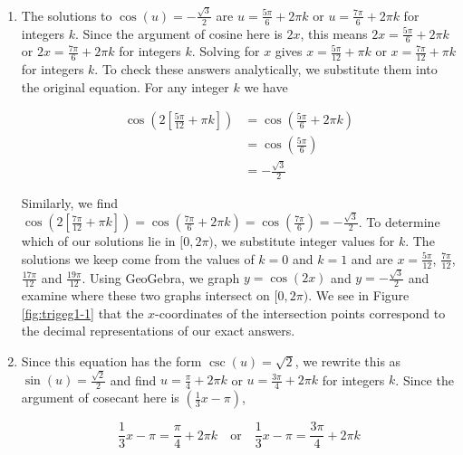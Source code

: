 {
\begin{enumerate}

\item  The solutions to $\cos(u) =-\frac{\sqrt{3}}{2}$ are $u = \frac{5\pi}{6} + 2\pi k$ or $u = \frac{7\pi}{6} + 2\pi k$ for integers $k$.  Since the argument of cosine here is $2x$, this means $2x = \frac{5\pi}{6} + 2\pi k$ or $2x = \frac{7\pi}{6} + 2\pi k$ for integers $k$.  Solving for $x$ gives $x = \frac{5\pi}{12} + \pi k$ or $x = \frac{7\pi}{12} + \pi k$ for integers $k$.  To check these answers analytically, we substitute them into the original equation.  For any integer $k$ we have

\begin{align*}
\cos\left( 2\left[\frac{5\pi}{12} + \pi k\right]\right) &  =   \cos\left(\frac{5\pi}{6} + 2\pi k\right)  \\ 															& =     \cos\left(\frac{5\pi}{6}\right)  \tag*{the period of cosine is $2\pi$} \\															& =   -\frac{\sqrt{3}}{2}
\end{align*}

Similarly, we find $\cos\left( 2\left[\frac{7\pi}{12} + \pi k\right]\right) = \cos\left(\frac{7\pi}{6} + 2\pi k\right) = \cos\left(\frac{7\pi}{6}\right) = -\frac{\sqrt{3}}{2}$.  To determine which of our solutions lie in $[0,2\pi)$, we substitute integer values for $k$.  The solutions we keep come from the values of $k = 0$ and $k =1$ and are  $x = \frac{5\pi}{12}$,  $\frac{7\pi}{12}$, $\frac{17\pi}{12}$ and $\frac{19\pi}{12}$.  Using GeoGebra, we graph $y = \cos(2x)$ and $y = -\frac{\sqrt{3}}{2}$ and examine where these two graphs intersect on $[0,2\pi)$.  We see in Figure \ref{fig:trigeg1-1} that the $x$-coordinates of the intersection points correspond to the decimal representations of our exact answers.


\item  Since this equation has the form $\csc(u) = \sqrt{2}$, we rewrite this as $\sin(u) = \frac{\sqrt{2}}{2}$ and find $u = \frac{\pi}{4} + 2\pi k$ or $u = \frac{3\pi}{4} + 2\pi  k$ for integers $k$.  Since the argument of cosecant here is $\left(\frac{1}{3}x-\pi \right)$,

\[
 \frac{1}{3}x-\pi = \frac{\pi}{4} + 2\pi k \quad \text{or} \quad  \frac{1}{3}x-\pi = \frac{3\pi}{4} + 2\pi k
\]


\end{enumerate}}
